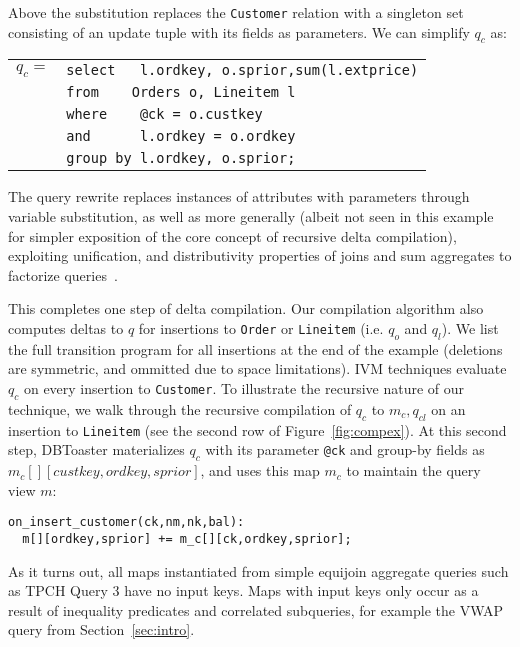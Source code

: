 \noindent Above the substitution replaces the {\tt Customer} relation with a
singleton set consisting of an update tuple with its fields as parameters. We
can simplify $q_{c}$ as:

\def \ql#1{{\tt #1}}
\vspace{1mm}
\begin{tabular}{ll}
$q_c =$  & \ql{select\ \ \ l.ordkey, o.sprior,sum(l.extprice)}\\
        & \ql{from\ \ \ \ Orders o, Lineitem l}\\
        & \ql{where\ \ \ \ @ck = o.custkey}\\
        & \ql{and\ \ \ \ \ \ l.ordkey = o.ordkey}\\
        & \ql{group by l.ordkey, o.sprior;}
\end{tabular}

\vspace{1mm}
The query rewrite replaces instances of attributes with parameters through
variable substitution, as well as more generally (albeit not seen in this
example for simpler exposition of the core concept of recursive delta
compilation), exploiting unification, and distributivity properties of joins and
sum aggregates to factorize queries~\cite{koch-pods:10}.

This completes one step of delta compilation. Our compilation algorithm also
computes deltas to $q$ for insertions to {\tt Order} or {\tt Lineitem} (i.e.
$q_{o}$ and $q_{l}$). We list the full transition program for all insertions at
the end of the example (deletions are symmetric, and ommitted due to space
limitations).
IVM techniques evaluate $q_{c}$ on every insertion to {\tt Customer}. To
illustrate the recursive nature of our technique, we walk through the recursive compilation
of $q_c$ to $m_c,q_{cl}$ on an insertion to {\tt Lineitem} (see the second row
of Figure~\ref{fig:compex}). At this second step, DBToaster materializes $q_c$
with its parameter {\tt @ck} and group-by fields as
$m_c[][custkey,ordkey,sprior]$, and uses this map $m_c$ to maintain the query
view $m$:

{\footnotesize
\begin{verbatim}
on_insert_customer(ck,nm,nk,bal):
  m[][ordkey,sprior] += m_c[][ck,ordkey,sprior];
\end{verbatim}
}

\noindent
As it turns out, all maps instantiated from simple equijoin aggregate queries
such as TPCH Query 3 have no input keys. Maps with input keys only occur as a
result of inequality predicates and correlated subqueries, for example the VWAP
query from Section~\ref{sec:intro}.


